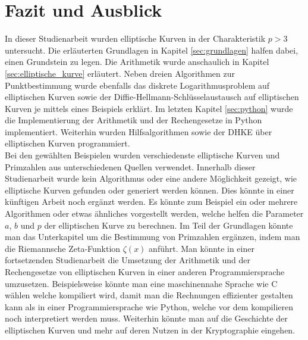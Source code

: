 \chapter{Fazit und Ausblick}
In dieser Studienarbeit wurden elliptische Kurven in der Charakteristik $p > 3$ untersucht. Die erläuterten Grundlagen in Kapitel \ref{sec:grundlagen} halfen dabei, einen Grundstein zu legen. Die Arithmetik wurde anschaulich in Kapitel \ref{sec:elliptische_kurve} erläutert. Neben dreien Algorithmen zur Punktbestimmung wurde ebenfalls das diskrete Logarithmusproblem auf elliptischen Kurven sowie der Diffie-Hellmann-Schlüsselaustausch auf elliptischen Kurven je mittels eines Beispiels erklärt. Im letzten Kapitel \ref{sec:python} wurde die Implementierung der Arithmetik und der Rechengesetze in Python implementiert. Weiterhin wurden Hilfsalgorithmen sowie der DHKE über elliptischen Kurven programmiert.\\

Bei den gewählten Beispielen wurden verschiedenste elliptische Kurven und Primzahlen aus unterschiedenen Quellen verwendet. Innerhalb dieser Studienarbeit wurde kein Algorithmus oder eine andere Möglichkeit gezeigt, wie elliptische Kurven gefunden oder generiert werden können. Dies könnte in einer künftigen Arbeit noch ergänzt werden. Es könnte zum Beispiel ein oder mehrere Algorithmen oder etwas ähnliches vorgestellt werden, welche helfen die Parameter $a$, $b$ und $p$ der elliptischen Kurve zu berechnen. Im Teil der Grundlagen könnte man das Unterkapitel um die Bestimmung von Primzahlen ergänzen, indem man die Riemannsche Zeta-Funktion $\zeta (x)$ anführt. Man könnte in einer fortsetzenden Studienarbeit die Umsetzung der Arithmetik und der Rechengesetze von elliptischen Kurven in einer anderen Programmiersprache umzusetzen. Beispielsweise könnte man eine maschinennahe Sprache wie C wählen welche kompiliert wird, damit man die Rechnungen effizienter gestalten kann als in einer Programmiersprache wie Python, welche vor dem kompilieren noch interpretiert werden muss. Weiterhin könnte man auf die Geschichte der elliptischen Kurven und mehr auf deren Nutzen in der Kryptographie eingehen.